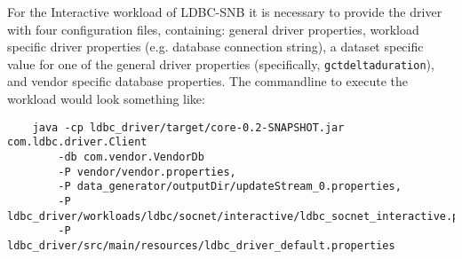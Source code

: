 For the Interactive workload of LDBC-SNB it is necessary to provide the driver with four configuration files, containing:
general driver properties,
workload specific driver properties (e.g. database connection string),
a dataset specific value for one of the general driver properties (specifically, \texttt{gctdeltaduration}),
and vendor specific database properties.
The commandline to execute the workload would look something like:

{\footnotesize
	\begin{verbatim}
	java -cp ldbc_driver/target/core-0.2-SNAPSHOT.jar com.ldbc.driver.Client 
		-db com.vendor.VendorDb 
		-P vendor/vendor.properties,
		-P data_generator/outputDir/updateStream_0.properties,
		-P ldbc_driver/workloads/ldbc/socnet/interactive/ldbc_socnet_interactive.properties 
		-P ldbc_driver/src/main/resources/ldbc_driver_default.properties
	\end{verbatim}
}
